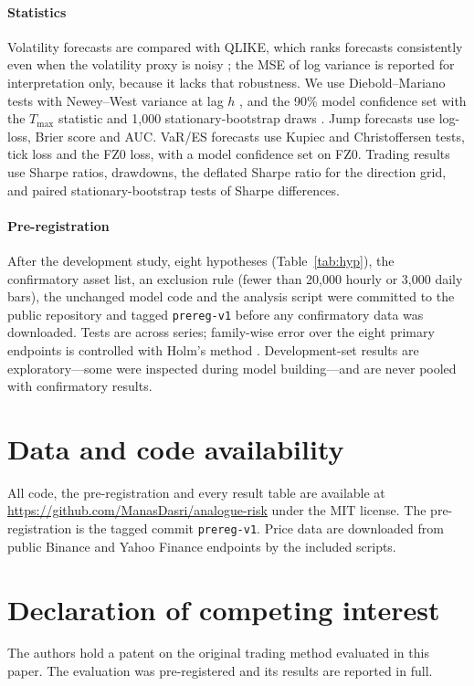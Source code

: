 \documentclass[preprint,12pt,authoryear]{elsarticle}
\begin{document}
\paragraph{Statistics} Volatility forecasts are compared with QLIKE, which ranks forecasts
consistently even when the volatility proxy is noisy \citep{patton2011}; the MSE of log variance is
reported for interpretation only, because it lacks that robustness. We use Diebold--Mariano
tests with Newey--West variance at lag $h$ \citep{newey1987}, and the 90\% model confidence set
with the $T_{\max}$ statistic and 1,000 stationary-bootstrap draws \citep{politis1994}. Jump
forecasts use log-loss, Brier score and AUC. VaR/ES forecasts use Kupiec and Christoffersen tests,
tick loss and the FZ0 loss, with a model confidence set on FZ0. Trading results use Sharpe ratios,
drawdowns, the deflated Sharpe ratio for the direction grid, and paired stationary-bootstrap tests
of Sharpe differences.

\paragraph{Pre-registration} After the development study, eight hypotheses
(Table~\ref{tab:hyp}), the confirmatory asset list, an exclusion rule (fewer than 20,000 hourly or
3,000 daily bars), the unchanged model code and the analysis script were committed to the public
repository and tagged \texttt{prereg-v1} before any confirmatory data was downloaded. Tests are
across series; family-wise error over the eight primary endpoints is controlled with Holm's method
\citep{holm1979}. Development-set results are exploratory---some were inspected during model
building---and are never pooled with confirmatory results.



\section*{Data and code availability}
All code, the pre-registration and every result table are available at
\url{https://github.com/ManasDasri/analogue-risk} under the MIT license. The pre-registration is the
tagged commit \texttt{prereg-v1}. Price data are downloaded from public Binance and Yahoo Finance
endpoints by the included scripts.

\section*{Declaration of competing interest}
The authors hold a patent on the original trading method evaluated in this paper. The evaluation
was pre-registered and its results are reported in full.
\end{document}
